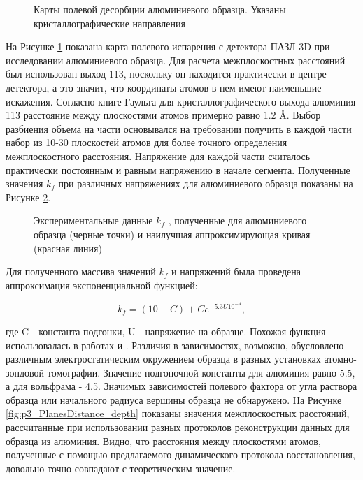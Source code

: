 \begin{figure}[htb]
	\caption{Карты полевой десорбции алюминиевого образца. Указаны кристаллографические направления \cite{scbibDensity}}
	\label{fig:p3_Alion}
\end{figure} 

На Рисунке \cref{fig:p3_Alion} показана карта полевого испарения с детектора ПАЗЛ-3D при исследовании алюминиевого образца. Для расчета межплоскостных расстояний был использован выход {113}, поскольку он находится практически в центре детектора, а это значит, что координаты атомов в нем имеют наименьшие искажения. Согласно книге Гаульта для кристаллографического выхода алюминия {113} расстояние между плоскостями атомов примерно равно 1.2 \r{A}. Выбор разбиения объема на части основывался на требовании получить в каждой части набор из 10-30 плоскостей атомов для более точного определения межплоскостного расстояния. Напряжение для каждой части считалось практически постоянным и равным напряжению в начале сегмента. Полученные значения $k_f$ при различных напряжениях для алюминиевого образца показаны на Рисунке \cref{fig:p3_kf_vs_voltage}. 

\begin{figure}[htb]
	\caption{Экспериментальные данные $k_f$ \cite{scbibDensity}, полученные для алюминиевого образца (черные точки) и наилучшая аппроксимирующая кривая (красная линия)}
	\label{fig:p3_kf_vs_voltage}
\end{figure} 

Для полученного массива значений $k_f$ и напряжений была проведена аппроксимация экспоненциальной функцией:

\begin{equation}
	\label{eq:equation3_n}
	k_f = (10 - C) + Ce^{-5.3 U 10^{-4}},
\end{equation} 

где C - константа подгонки, U - напряжение на образце. Похожая функция использовалась в работах \cite{Hatzoglou19} и \cite{Loi13}. Различия в зависимостях, возможно, обусловлено различным электростатическим окружением образца в разных установках атомно-зондовой томографии. Значение подгоночной константы для алюминия равно 5.5, а для вольфрама - 4.5. Значимых зависимостей полевого фактора от угла раствора образца или начального радиуса вершины образца не обнаружено. На Рисунке \cref{fig:p3_PlanesDistance_depth} показаны значения межплоскостных расстояний, рассчитанные при использовании разных протоколов реконструкции данных для образца из алюминия. Видно, что  расстояния между плоскостями атомов,  полученные с помощью предлагаемого динамического протокола восстановления, довольно точно совпадают с теоретическим значение.

